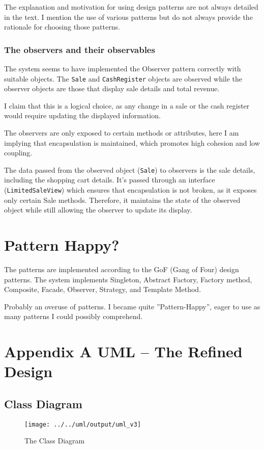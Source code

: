 \documentclass[a4paper]{scrreprt}
\begin{document}
The explanation and motivation for using design patterns are not always detailed in the text.
I mention the use of various patterns but do not always provide the rationale for choosing those patterns.

\subsubsection*{The observers and their observables}
The system seems to have implemented the Observer pattern correctly with suitable objects.
The \texttt{Sale} and \texttt{CashRegister} objects are observed while the observer objects
are those that display sale details and total revenue.

I claim that this is a logical choice,
as any change in a sale or the cash register would require updating the displayed information.

The observers are only exposed to certain methods or attributes,
here I am implying that encapsulation is maintained, which promotes high cohesion and low coupling.

The data passed from the observed object (\texttt{Sale}) to observers is the sale details,
including the shopping cart details.
It's passed through an interface (\texttt{LimitedSaleView}) which ensures that encapsulation is not broken,
as it exposes only certain Sale methods.
Therefore, it maintains the state of the observed object while still allowing the observer to update its display.

\section*{Pattern Happy?}
The patterns are implemented according to the GoF (Gang of Four) design patterns.
The system implements Singleton, Abstract Factory, Factory method,
Composite, Facade, Observer, Strategy, and Template Method.

Probably an overuse of patterns.
I became quite ''Pattern-Happy'', eager to use as many patterns I could possibly comprehend.
\newpage
\appendix
\section*{Appendix A UML -- The Refined Design}
\subsection*{Class Diagram}
\begin{figure}[H]
    \begin{center}
        \texttt{[image: ../../uml/output/uml\_v3]}
        \caption{The Class Diagram}
        \label{fig:CD}
    \end{center}
\end{figure}
\end{document}
